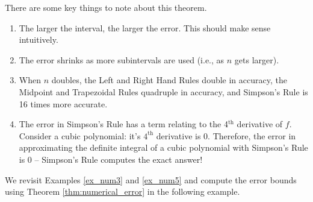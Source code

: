There are some key things to note about this theorem.
\begin{enumerate}
	\item	The larger the interval, the larger the error. This should make sense intuitively.
	\item	The error shrinks as more subintervals are used (i.e., as $n$ gets larger).
	\item	When $n$ doubles, the Left and Right Hand Rules double in accuracy, the Midpoint and Trapezoidal Rules quadruple in accuracy, and Simpson's Rule is 16 times more accurate.
	\item	The error in Simpson's Rule has a term relating to the 4$^{\text{th}}$ derivative of $f$. Consider a cubic polynomial: it's $4^{\text{th}}$ derivative is 0. Therefore, the error in approximating the definite integral of a cubic polynomial with Simpson's Rule is 0 -- Simpson's Rule computes the exact answer!
\end{enumerate}

We revisit Examples \ref{ex_num3} and \ref{ex_num5} and compute the error bounds using Theorem \ref{thm:numerical_error} in the following example.\\

